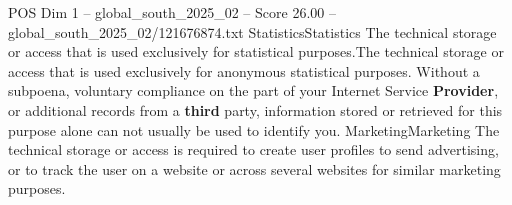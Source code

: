 \begin{textsample}{POS Dim 1 – global\_south\_2025\_02 – Score 26.00 – global\_south\_2025\_02/121676874.txt}
StatisticsStatistics The technical storage or access that is used exclusively for statistical purposes.The technical storage or access that is used exclusively for anonymous statistical purposes.
Without a subpoena, voluntary compliance on the part of your Internet Service \textbf{Provider}, or additional records from a \textbf{third} party, information stored or retrieved for this purpose alone can not usually be used to identify you.
MarketingMarketing The technical storage or access is required to create user profiles to send advertising, or to track the user on a website or across several websites for similar marketing purposes.

\end{textsample}
